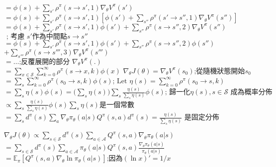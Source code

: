 $= \phi(s) + \sum_{s'} \rho^\pi(s \to s', 1) {\nabla_\theta V^\pi(s')}$ \\[5pt]
$= \phi(s) + \sum_{s'} \rho^\pi(s \to s', 1){[ \phi(s') + \sum_{s''} \rho^\pi(s' \to s'', 1) \nabla_\theta V^\pi(s'')]}$ \\[5pt]
$= \phi(s) + \sum_{s'} \rho^\pi(s \to s', 1) \phi(s') + \sum_{s''} \rho^\pi(s \to s'', 2){\nabla_\theta V^\pi(s'')} $
\\
$\scriptstyle{\text{ ; 考慮 }s'\text{作為中間點}s \to s''}$\\[5pt]
$= \phi(s) + \sum_{s'} \rho^\pi(s \to s', 1) \phi(s') + \sum_{s''} \rho^\pi(s \to s'', 2)\phi(s'') $
\\
$+ \sum_{s'''} \rho^\pi(s \to s''', 3){\nabla_\theta V^\pi(s''')}$ \\[5pt]
$= \dots \scriptstyle{\text{;反覆展開的部分 }\nabla_\theta V^\pi(.)}$ \\[5pt]
$= \sum_{x\in\mathcal{S}}\sum_{k=0}^\infty \rho^\pi(s \to x, k) \phi(x)$
$\nabla_\theta J(\theta)
= \nabla_\theta V^\pi(s_0)  \scriptstyle{\text{;從隨機狀態開始} s_0} $\\[5pt]
$= \sum_{s}{\sum_{k=0}^\infty \rho^\pi(s_0 \to s, k)} \phi(s) \scriptstyle{\text{; Let }{\eta(s) = \sum_{k=0}^\infty \rho^\pi(s_0 \to s, k)}} $\\[5pt]
$= \sum_{s}\eta(s) \phi(s) 
= \Big( {\sum_s \eta(s)} \Big)\sum_{s}\frac{\eta(s)}{\sum_s \eta(s)} \phi(s)  
\scriptstyle{\text{; 歸一化} \eta(s), s\in\mathcal{S} \text{ 成為概率分佈}}$\\[5pt]
$\propto \sum_s \frac{\eta(s)}{\sum_s \eta(s)} \phi(s)  \scriptstyle{\sum_s \eta(s)\text{是一個常數}}$ \\[5pt]
$= \sum_s d^\pi(s) \sum_a \nabla_\theta \pi_\theta(a \vert s)Q^\pi(s, a)  \scriptstyle{d^\pi(s) = \frac{\eta(s)}{\sum_s \eta(s)}\text{ 是固定分佈}}$

$\nabla_\theta J(\theta)
\propto \sum_{s \in \mathcal{S}} d^\pi(s) \sum_{a \in \mathcal{A}} Q^\pi(s, a) \nabla_\theta \pi_\theta(a \vert s) $\\[5pt]
$= \sum_{s \in \mathcal{S}} d^\pi(s) \sum_{a \in \mathcal{A}} \pi_\theta(a \vert s) Q^\pi(s, a) \frac{\nabla_\theta \pi_\theta(a \vert s)}{\pi_\theta(a \vert s)} $\\[5pt]
$= \mathbb{E}_\pi [Q^\pi(s, a) \nabla_\theta \ln \pi_\theta(a \vert s)]  \scriptstyle{\text{;因為} (\ln x)' = 1/x}$
\\[5pt]
